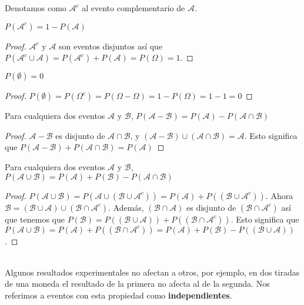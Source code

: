 Denotamos como $\mathcal{A}^{c}$ al evento complementario de $\mathcal{A}$.
\begin{proposicion}
$P(\mathcal{A}^{c})=1-P(\mathcal{A})$
\end{proposicion}
\begin{proof}
$\mathcal{A}^{c}$ y $\mathcal{A}$ son eventos disjuntos así que $P(\mathcal{A}^{c} \cup \mathcal{A})=P(\mathcal{A}^{c})+P(\mathcal{A})=P(\Omega)=1$.
\end{proof}
\begin{proposicion}
$P(\emptyset)=0$
\end{proposicion}
\begin{proof}
$P(\emptyset)=P(\Omega^{c})=P(\Omega - \Omega)=1-P(\Omega)=1-1=0$
\end{proof}
\begin{proposicion}
Para cualquiera dos eventos $\mathcal{A}$ y $\mathcal{B}$, $P(\mathcal{A}-\mathcal{B})=P(\mathcal{A})-P(\mathcal{A} \cap \mathcal{B})$
\end{proposicion}
\begin{proof}
$\mathcal{A}-\mathcal{B}$ es disjunto de $\mathcal{A} \cap \mathcal{B}$, y $(\mathcal{A}-\mathcal{B}) \cup (\mathcal{A} \cap \mathcal{B})=\mathcal{A}$. Esto significa que $P(\mathcal{A}-\mathcal{B})+P(\mathcal{A} \cap \mathcal{B})=P(\mathcal{A})$
\end{proof}
\begin{proposicion}
Para cualquiera dos eventos $\mathcal{A}$ y $\mathcal{B}$, $P(\mathcal{A} \cup \mathcal{B})=P(\mathcal{A}) + P(\mathcal{B})-P(\mathcal{A} \cap \mathcal{B})$
\end{proposicion}
\begin{proof}
$P(\mathcal{A} \cup \mathcal{B})=P(\mathcal{A} \cup (\mathcal{B} \cup \mathcal{A}^{c}))=P(\mathcal{A})+P((\mathcal{B} \cup \mathcal{A}^{c}))$. Ahora $\mathcal{B}=(\mathcal{B} \cup \mathcal{A})\cup (\mathcal{B} \cap \mathcal{A}^{c})$. Además, $(\mathcal{B} \cap \mathcal{A})$ es disjunto de $(\mathcal{B} \cap \mathcal{A}^{c})$ así que tenemos que $P(\mathcal{B})=P((\mathcal{B} \cup \mathcal{A})) + P((\mathcal{B} \cap \mathcal{A}^{c}))$. Esto significa que $P(\mathcal{A} \cup \mathcal{B})=P(\mathcal{A})+P((\mathcal{B} \cap \mathcal{A}^{c}))=P(\mathcal{A})+P(\mathcal{B})-P((\mathcal{B} \cup \mathcal{A}))$.
\end{proof}
\cite{forsyth2018probability}\\
Algunos resultados experimentales no afectan a otros, por ejemplo, en dos tiradas de una moneda el resultado de la primera no afecta al de la segunda. Nos referimos a eventos con esta propiedad como \textbf{independientes}.
